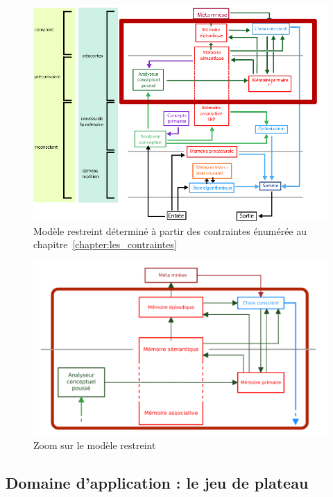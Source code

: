 \begin{figure}[H] 
\includegraphics[width=\textwidth]{files/modele_restreint} 
\caption{Modèle restreint déterminé à partir des contraintes énumérée au chapitre~\ref{chapter:les_contraintes}} 
\label{modele_restreint}
\end{figure}

\begin{figure}[H] 
\includegraphics[width=\textwidth]{files/restricted_model_french} 
\caption{Zoom sur le  modèle restreint} 
\label{zoom_modele_restreint}
\end{figure}

\subsection{Domaine d'application : le jeu de plateau}
\label{section:domaine_application_le_jeu_de_plateau}

